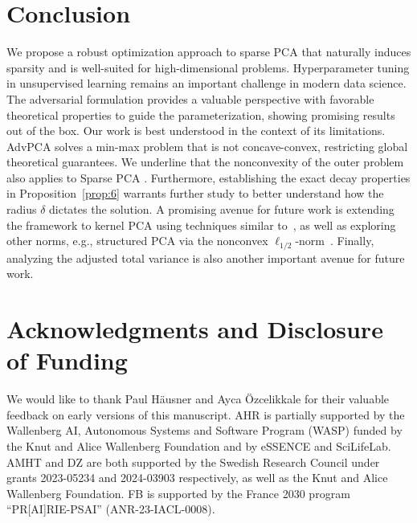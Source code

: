 \documentclass{article}
\begin{document}
\section{Conclusion}\label{sec:conclusion}
We propose a robust optimization approach to sparse PCA that naturally induces sparsity and is well-suited for high-dimensional problems. Hyperparameter tuning in unsupervised learning remains an important challenge in modern data science. The adversarial formulation provides a valuable perspective with favorable theoretical properties to guide the parameterization, showing promising results out of the box. Our work is best understood in the context of its limitations. AdvPCA solves a min-max problem that is not concave-convex, restricting global theoretical guarantees. We underline that the nonconvexity of the outer problem also applies to Sparse PCA \cite{zou_sparse_2006}. Furthermore, establishing the exact decay properties in Proposition~\ref{prop:6} warrants further study to better understand how the radius $\delta$ dictates the solution. A promising avenue for future work is extending the framework to kernel PCA using techniques similar to~\cite{ribeiro_kernel_2025}, as well as exploring other norms, e.g., structured PCA via the nonconvex $\ell_{1/2}$-norm~\cite{pmlr-v9-jenatton10a}. Finally, analyzing the adjusted total variance is also another important avenue for future work.


\section{Acknowledgments and Disclosure of Funding}
\label{sec:aknowledgment}
We would like to thank Paul Häusner and Ayca Özcelikkale for their valuable feedback on early versions of this manuscript.
AHR is partially supported  by the Wallenberg AI, Autonomous Systems and Software Program (WASP) funded by the Knut and Alice Wallenberg Foundation and by eSSENCE and SciLifeLab. 
AMHT and DZ are both supported by the Swedish Research Council under grants 2023-05234 and 2024-03903 respectively, as well as the Knut and Alice Wallenberg Foundation. FB is supported by the France 2030 program “PR[AI]RIE-PSAI” (ANR-23-IACL-0008).
\end{document}
